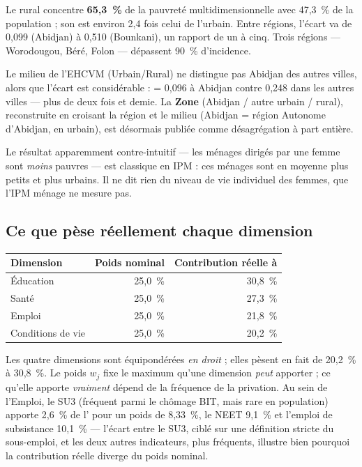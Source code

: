 \documentclass[11pt,a4paper]{article}
\begin{document}
Le rural concentre \textbf{65,3~\%} de la pauvreté multidimensionnelle avec 47,3~\% de la
population ; son \ipm{} est environ 2,4 fois celui de l'urbain. Entre régions, l'écart va de
0,099 (Abidjan) à 0,510 (Bounkani), un rapport de un à cinq. Trois régions --- Worodougou, Béré,
Folon --- dépassent 90~\% d'incidence.

\begin{retenir}
Le milieu de l'EHCVM (Urbain/Rural) ne distingue pas Abidjan des autres villes, alors que l'écart
est considérable : \ipm{} = 0,096 à Abidjan contre 0,248 dans les autres villes --- plus de deux
fois et demie. La \textbf{Zone} (Abidjan / autre urbain / rural), reconstruite en croisant la
région et le milieu (Abidjan = région Autonome d'Abidjan, en urbain), est désormais publiée comme
désagrégation à part entière.
\end{retenir}

Le résultat apparemment contre-intuitif --- les ménages dirigés par une femme sont \emph{moins}
pauvres --- est classique en IPM : ces ménages sont en moyenne plus petits et plus urbains. Il ne
dit rien du niveau de vie individuel des femmes, que l'IPM ménage ne mesure pas.

\subsection{Ce que pèse réellement chaque dimension}

\begin{center}
\begin{tabular}{@{}lrr@{}}
\toprule
\textbf{Dimension} & \textbf{Poids nominal} & \textbf{Contribution réelle à \ipm{}} \\
\midrule
Éducation & 25,0~\% & 30,8~\% \\
Santé & 25,0~\% & 27,3~\% \\
Emploi & 25,0~\% & 21,8~\% \\
Conditions de vie & 25,0~\% & 20,2~\% \\
\bottomrule
\end{tabular}
\end{center}

\begin{attention}
Les quatre dimensions sont équipondérées \emph{en droit} ; elles pèsent en fait de 20,2~\% à
30,8~\%. Le poids $w_j$ fixe le maximum qu'une dimension \emph{peut} apporter ; ce qu'elle
apporte \emph{vraiment} dépend de la fréquence de la privation. Au sein de l'Emploi, le SU3
(fréquent parmi le chômage BIT, mais rare en population) apporte 2,6~\% de l'\ipm{} pour un poids
de 8,33~\%, le NEET 9,1~\% et l'emploi de subsistance 10,1~\% --- l'écart entre le SU3, ciblé sur
une définition stricte du sous-emploi, et les deux autres indicateurs, plus fréquents, illustre
bien pourquoi la contribution réelle diverge du poids nominal.
\end{attention}
\end{document}
